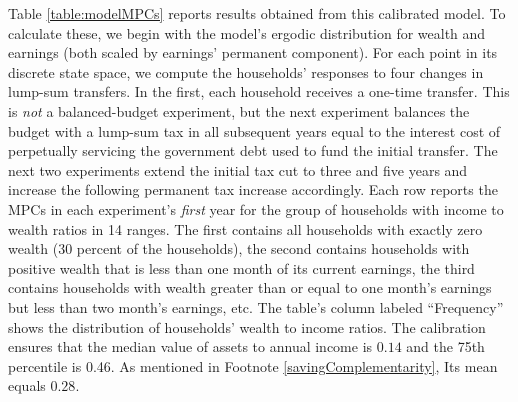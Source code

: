 \documentclass[fleqccn,12pt]{article}
\begin{document}
Table \ref{table:modelMPCs} reports results obtained from this calibrated model. To calculate these, we begin with the model's ergodic distribution for wealth and earnings (both scaled by earnings' permanent component). For each point in its discrete state space, we compute the households' responses to four changes in lump-sum transfers. In the first, each household receives a one-time transfer. This is \emph{not} a balanced-budget experiment, but the next experiment balances the budget with a lump-sum tax in all subsequent years equal to the interest cost of perpetually servicing the government debt used to fund the initial transfer. The next two experiments extend the initial tax cut to three and five years and increase the following permanent tax increase accordingly. Each row reports the MPCs in each experiment's \emph{first} year for the group of households with income to wealth ratios in 14 ranges. The first contains all households with exactly zero wealth ($30$ percent of the households), the second contains households with positive wealth that is less than one month of its current earnings, the third contains households with wealth greater than or equal to one month's earnings but less than two month's earnings, etc. The table's column labeled ``Frequency'' shows the distribution of households' wealth to income ratios. The calibration ensures that the median  value of assets to annual income is $0.14$ and the 75th percentile is 0.46. As mentioned in Footnote \ref{savingComplementarity}, Its mean equals $0.28$. 
\end{document}

